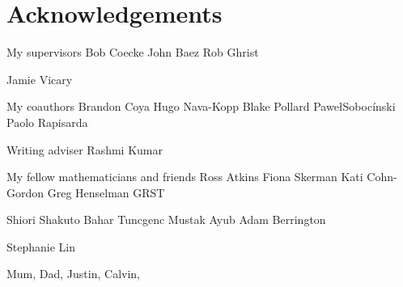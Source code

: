\section*{Acknowledgements}
My supervisors
Bob Coecke
John Baez
Rob Ghrist

Jamie Vicary

My coauthors
Brandon Coya
Hugo Nava-Kopp
Blake Pollard
Pawe\l Soboc\'inski
Paolo Rapisarda

Writing adviser Rashmi Kumar

My fellow mathematicians and friends
Ross Atkins
Fiona Skerman
Kati Cohn-Gordon
Greg Henselman
GRST 

Shiori Shakuto
Bahar Tuncgenc
Mustak Ayub
Adam Berrington


Stephanie Lin

Mum, Dad, Justin, Calvin,


